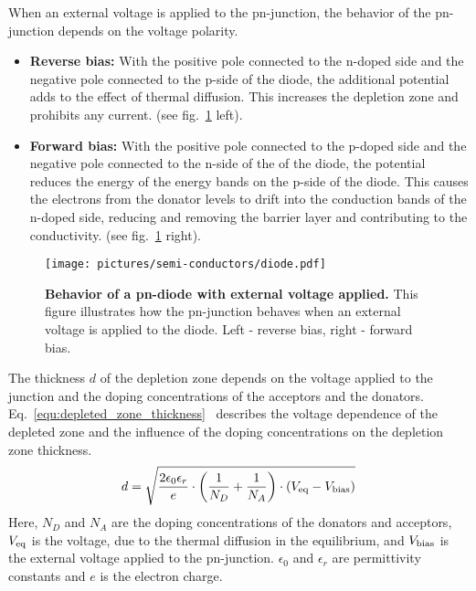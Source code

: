 When an external voltage is applied to the pn-junction, the behavior of the pn-junction depends on the voltage polarity.
\begin{itemize}
\item \textbf{Reverse bias:} With the positive pole connected to the n-doped side and the negative pole connected to the p-side of the diode, the additional potential adds to the effect of thermal diffusion. This increases the depletion zone and prohibits any current. (see fig.~\ref{fig.diode} left).
\item \textbf{Forward bias:} With the positive pole connected to the p-doped side and the negative pole connected to the n-side of the of the diode, the potential reduces the energy of the energy bands on the p-side of the diode. This causes the electrons from the donator levels to drift into the conduction bands of the n-doped side, reducing and removing the barrier layer and contributing to the conductivity.
(see fig.~\ref{fig.diode} right).
\end{itemize}
\begin{figure}
\begin{center}
\texttt{[image: pictures/semi-conductors/diode.pdf]}
\end{center}
\caption[Behavior of a pn-diode with external voltage applied]{\textbf{Behavior of a pn-diode with external voltage applied.} This figure illustrates how the pn-junction behaves when an external voltage is applied to the diode. Left - reverse bias, right - forward bias.}\label{fig.diode}
\end{figure}
The thickness $d$ of the depletion zone depends on the voltage applied to the junction and the doping concentrations of the acceptors and the donators. Eq.~\ref{equ:depleted_zone_thickness}~\cite{Lut99} describes the voltage dependence of the depleted zone and the influence of the doping concentrations on the depletion zone thickness.
\begin{equation}
d=\sqrt{\frac{2 \epsilon _0 \epsilon _r}{e}\cdot \left(\frac{1}{N_D}+\frac{1}{N_A}\right)\cdot \left(V_{\rm{eq}}-V_{\rm{bias}}\right)}\label{equ:depleted_zone_thickness}
\end{equation}
Here, $N_D$ and $N_A$ are the doping concentrations of the donators and acceptors, $V_{\rm{eq}}$ is the voltage, due to the thermal diffusion in the equilibrium, and $V_{\rm{bias}}$ is the external voltage applied to the pn-junction. $\epsilon _0$ and $\epsilon _r$ are permittivity constants and $e$ is the electron charge.

